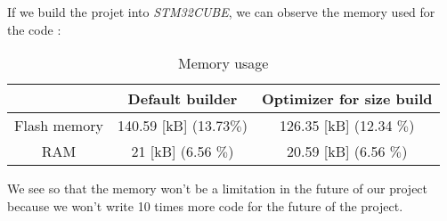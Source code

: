 \documentclass{article}
\begin{document}

If we build the projet into \textit{STM32CUBE}, we can observe the memory used for the code :
\begin{table}[H]
    \centering
    \begin{tabular}{|c|c|c|}
        \hline
        & Default builder & Optimizer for size build \\ 
        \hline
        Flash memory & 140.59 [kB] (13.73$\%$) & 126.35 [kB] (12.34 $\%$) \\
        \hline
        RAM & 21 [kB] (6.56 $\%$) & 20.59 [kB] (6.56 $\%$) \\
        \hline
    \end{tabular}
    \caption{Memory usage}
    \label{tab:my_label}
\end{table}
We see so that the memory won't be a limitation in the future of our project because we won't write 10 times more code for the future of the project.\\\\


\end{document}

